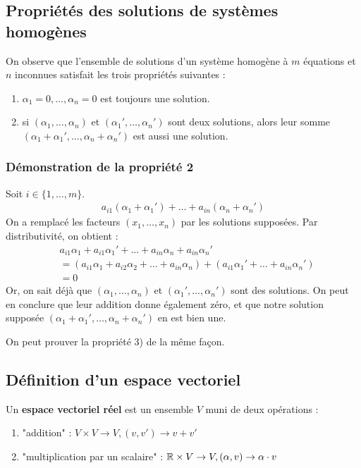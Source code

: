 \documentclass[12pt]{article}
\begin{document}
\pagebreak
\subsection{Propriétés des solutions de systèmes homogènes}
On observe que l'ensemble de solutions d'un système homogène à $m$ équations et $n$ inconnues satisfait les trois propriétés suivantes :
\begin{enumerate}
    \item $\alpha_1 = 0, \dots, \alpha_n = 0$ est toujours une solution.
    \item si $(\alpha_1, \dots, \alpha_n)$ et $(\alpha_1', \dots, \alpha_n')$ 
    sont deux solutions, alors leur somme $(\alpha_1+\alpha_1', \dots, \alpha_n+\alpha_n')$ est aussi une solution.
\end{enumerate}
\subsubsection{Démonstration de la propriété 2}
Soit $i \in \{1, \dots, m\}$.
$$\begin{aligned}
a_{i1}(\alpha_1+\alpha_1') + \dots + a_{in}(\alpha_n+\alpha_n')
\end{aligned}
$$
On a remplacé les facteurs $(x_1, \dots, x_n)$ par les solutions supposées.
Par distributivité, on obtient :
$$\begin{aligned}
    &a_{i1}\alpha_1 + a_{i1}\alpha_1' + \dots + a_{in}\alpha_n + a_{in}\alpha_n' \\
    &= (a_{i1}\alpha_{1}+a_{i2}\alpha_2+\dots+a_{in}\alpha_n) + (a_{i1}\alpha_{1}'+\dots+a_{in}\alpha_n') \\
    &= 0 
\end{aligned}
$$
Or, on sait déjà que $(\alpha_1, \dots, \alpha_n)$ et $(\alpha_1', \dots, \alpha_n')$ sont des solutions. On peut en conclure que leur addition donne également zéro, et que notre solution supposée $(\alpha_1 + \alpha_1', \dots, \alpha_n + \alpha_n')$ en est bien une.

On peut prouver la propriété 3) de la même façon.

\pagebreak
\subsection{Définition d'un espace vectoriel}
Un \textbf{espace vectoriel réel} est un ensemble $V$ muni de deux opérations :
\begin{enumerate}
    \item "addition" : $V \times V \rightarrow V, (v, v') \rightarrow v + v'$
    \item "multiplication par un scalaire" : $\mathbb{R} \times V \rightarrow V, (\alpha, v) \rightarrow \alpha \cdot v$ 
\end{enumerate}
\end{document}
